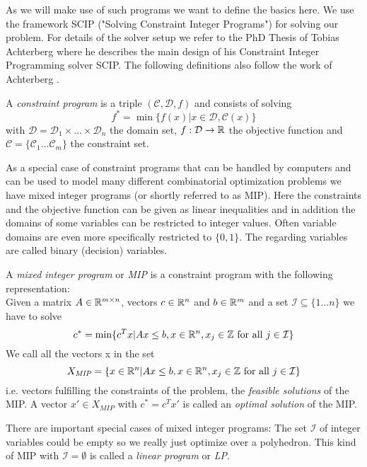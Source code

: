 As we will make use of such programs we want to define the basics here. We use the framework SCIP ("Solving Constraint 
Integer Programs") for solving our problem. For details of the solver setup we refer to the PhD Thesis of Tobias 
Achterberg \cite{Achterberg2007} where he describes the main design of his Constraint Integer Programming solver SCIP. 
The following definitions also follow the work of Achterberg \cite{Achterberg2007}.

\begin{definition}
 A \textit{constraint program} is a triple $(\mathcal{C},\mathcal{D},f)$ and consists of solving
 $$f^*=\min\{f(x)|x\in \mathcal{D}, \mathcal{C}(x)\}$$ 
 with $\mathcal{D}=\mathcal{D}_1\times \dots\times \mathcal{D}_n$ the domain set, $f:\mathcal{D}\to\mathbb{R}$ the objective 
function and $\mathcal{C}=\{\mathcal{C}_1\dots \mathcal{C}_m\}$ the constraint set.
\end{definition}

As a special case of constraint programs that can be handled by computers and can be used to model many different 
combinatorial optimization problems we have mixed integer programs (or shortly referred to as MIP). Here the 
constraints and the objective function can be given as linear inequalities and in addition the domains of some 
variables can be restricted to integer values. Often variable domains are even more specifically restricted to 
$\{0,1\}$. The regarding variables are called binary (decision) variables.

\begin{definition}
 A \textit{mixed integer program} or \textit{MIP} is a constraint program with the following representation:\\
 Given a matrix $A\in\mathbb{R}^{m\times n}$, vectors $c\in\mathbb{R}^n$ and $b\in \mathbb{R}^m$ and a set $\mathcal{I}\subseteq \{1\dots n\}$ 
 we have to solve
 $$c^*=\min\{c^T x|Ax\le b, x\in\mathbb{R}^n, x_j\in\mathbb{Z}\textrm{ for all }j\in\mathcal{I} \}$$
 We call all the vectors x in the set
 $$X_\textit{MIP}=\{x\in\mathbb{R}^n|A x\le b, x\in\mathbb{R}^n, x_j\in\mathbb{Z}\textrm{ for all }j\in\mathcal{I} \}$$
 i.e. vectors fulfilling the constraints of the problem, the \textit{feasible solutions} of the MIP. A vector $x'\in 
 X_\textit{MIP}$ with $c^*=c^Tx'$ is called an \textit{optimal solution} of the MIP.
\end{definition}

There are important special cases of mixed integer programs: The set $\mathcal{I}$ of integer variables could be empty 
so we really just optimize over a polyhedron. This kind of MIP with $\mathcal{I}=\emptyset$ is called a \textit{linear 
program} or \textit{LP}. 

